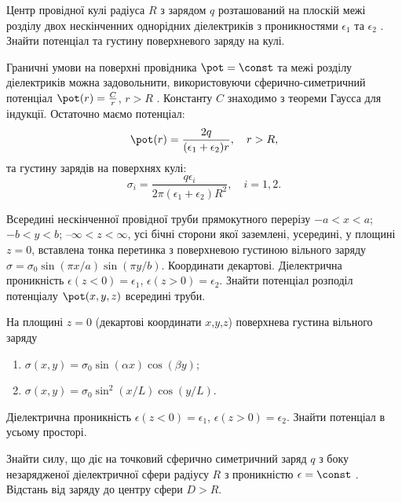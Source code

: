 \begin{problem}
Центр провідної кулі радіуса $R$  з зарядом $q$  розташований на плоскій межі розділу двох нескінченних однорідних діелектриків з проникностями $\epsilon_1$ та $\epsilon_2$ . Знайти потенціал та густину поверхневого заряду на кулі.
\begin{solution}
	Граничні умови на поверхні провідника $\pot = \const$  та межі розділу діелектриків можна задовольнити, використовуючи сферично-симетричний потенціал  $\pot(r) = \frac{C}{r}$, $r > R$ . Константу $C$ знаходимо з теореми Гаусса для індукції. Остаточно маємо потенціал:
	\[
		\pot(r) = \frac{2q}{(\epsilon_1 + \epsilon_2)r}, \quad r > R,
	\]
	та густину зарядів на поверхнях кулі:
	\[
		\sigma_i = \frac{q\epsilon_i}{2\pi(\epsilon_1 + \epsilon_2)R^2}, \quad i = 1,2.
	\]
\end{solution}
\end{problem}

\begin{problem}
Всередині нескінченної провідної труби прямокутного перерізу $-a<x<a$; $-b<y<b$; $–\infty<z<\infty$, усі бічні сторони якої заземлені, усередині, у площині $z=0$, вставлена тонка перетинка з поверхневою густиною вільного заряду $\sigma  = \sigma _0\sin (\pi x/a)\sin (\pi y/b)$. Координати декартові. Діелектрична проникність  $\epsilon (z < 0) = \epsilon _1$, $\epsilon (z > 0) = \epsilon _2$. Знайти потенціал розподіл потенціалу $\pot(x,y,z)$ всередині труби.
\end{problem}

\begin{problem}
На площині $z=0$ (декартові координати $x$,$y$,$z$) поверхнева густина вільного заряду
\begin{enumerate}[label=\alph*)]
	\item $\sigma (x,y) = \sigma _0\sin (\alpha x)\cos (\beta y)$;
	\item $\sigma (x,y) = {\sigma _0}{\sin ^2}(x/L)\cos (y/L)$.
\end{enumerate}
Діелектрична проникність  $\epsilon (z < 0) = \epsilon _1$, $\epsilon (z > 0) = \epsilon _2$. Знайти потенціал в усьому просторі.
\end{problem}

\begin{problem}
Знайти силу, що діє на точковий сферично симетричний заряд  $q$ з боку незарядженої діелектричної сфери радіусу $R$  з проникністю $\epsilon = \const$ . Відстань від заряду до центру сфери $D > R$.
\end{problem}


